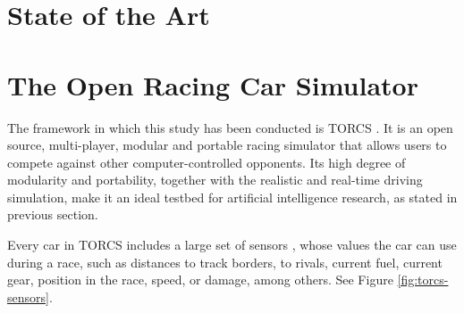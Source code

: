 \documentclass[10pt,journal,compsoc]{IEEEtran}
\begin{document}



\section{State of the Art}
\label{sec:soa}






\section{The Open Racing Car Simulator}
\label{sec:torcs}

The framework in which this study has been conducted is TORCS \cite{torcs4}. It is an open source, multi-player, modular and portable racing simulator that allows users to compete against other computer-controlled opponents.
Its high degree of modularity and portability, together with the
realistic and real-time driving simulation, make it an ideal testbed
for artificial intelligence research, as stated in previous section.

Every car in TORCS includes  a large set of sensors \cite{manualTORCS},
whose values the car can use during a race, such as distances to track borders, to rivals, current fuel, current gear, position in the race, speed, or damage, among others. See Figure \ref{fig:torcs-sensors}.
\end{document}
